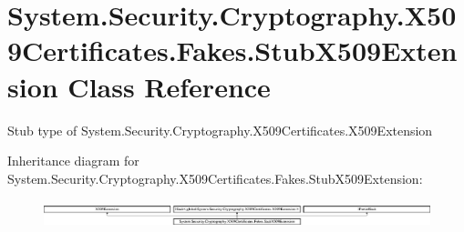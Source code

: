 \hypertarget{class_system_1_1_security_1_1_cryptography_1_1_x509_certificates_1_1_fakes_1_1_stub_x509_extension}{\section{System.\-Security.\-Cryptography.\-X509\-Certificates.\-Fakes.\-Stub\-X509\-Extension Class Reference}
\label{class_system_1_1_security_1_1_cryptography_1_1_x509_certificates_1_1_fakes_1_1_stub_x509_extension}
}


Stub type of System.\-Security.\-Cryptography.\-X509\-Certificates.\-X509\-Extension 


Inheritance diagram for System.\-Security.\-Cryptography.\-X509\-Certificates.\-Fakes.\-Stub\-X509\-Extension\-:\begin{figure}[H]
\begin{center}
\leavevmode
\includegraphics[height=0.796020cm]{class_system_1_1_security_1_1_cryptography_1_1_x509_certificates_1_1_fakes_1_1_stub_x509_extension}
\end{center}
\end{figure}
